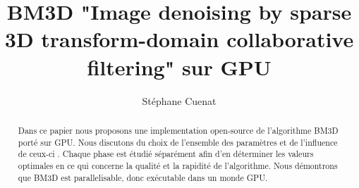 \documentclass{report}
\begin{document}
\title{BM3D "Image denoising by sparse 3D transform-domain collaborative filtering" sur GPU}
\author{Stéphane Cuenat}
\maketitle

\begin{abstract}
Dans ce papier nous proposons une implementation open-source de l'algorithme BM3D porté sur GPU. Nous discutons du choix de l'ensemble des paramètres et de l'influence de ceux-ci . Chaque phase est étudié séparément afin d'en déterminer les valeurs optimales en ce qui concerne la qualité et la rapidité de l'algorithme. Nous démontrons que BM3D est parallelisable, donc exécutable dans un monde GPU.   

\end{abstract}






\end{document}
